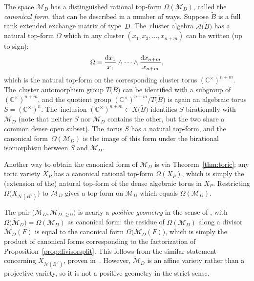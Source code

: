 \documentclass[10pt,a4paper]{amsart}
\def\C{{\mathbb C}}
\def\A{{\mathcal{A}}}
\def\tB{{\tilde B}}
\def\M{{\mathcal{M}}}
\def\tM{{\widetilde {\mathcal{M}}}}
\def\tB{{\tilde B}}
\def\N{{\mathcal{N}}}
\numberwithin{equation}{section}
\begin{document}
\bigskip{}
The space $\M_{D}$ has a distinguished rational top-form $\Omega(\M_D)$, called the \emph{canonical form}, that can be described in a number of ways. Suppose $\tB$ is a full rank extended exchange mat\-rix of type~$D$. The~cluster algebra $\A\big(\tB\big)$ has a natural top-form $\Omega$ which in any cluster $(x_1,x_2,\dots,x_{n+m})$ can be written (up to sign):
\begin{gather*}
\Omega = \frac{{\rm d}x_1}{x_1} \wedge \cdots \wedge \frac{{\rm d}x_{n+m}}{x_{n+m}},
\end{gather*}
which is the natural top-form on the corresponding cluster torus $(\C^\times)^{n+m}$. The~cluster automorphism group $T\big(\tB\big)$ can be identified with a subgroup of $(\C^\times)^{n+m}$, and the quotient group $(\C^\times)^{n+m}/T\big(\tB\big)$ is again an algebraic torus $S = (\C^\times)^n$. The~inclusion $(\C^\times)^{n+m} \subset X\big(\tB\big)$ identifies $S$ birationally with $\M_D$ (note that neither $S$ nor $\M_D$ contains the other, but the two share a common dense open subset). The~torus $S$ has a natural top-form, and the canonical form~$\Omega(\M_D)$ is the image of this form under the birational isomorphism between $S$ and $\M_D$.

Another way to obtain the canonical form of $\M_D$ is via Theorem~\ref{thm:toric}: any toric variety $X_P$ has a canonical rational top-form $\Omega(X_P)$, which is simply the (extension of the) natural top-form of the dense algebraic torus in $X_P$. Restricting $\Omega\big(X_{\N(B^\vee)}\big)$ to $\M_D$ gives a top-form on $\M_D$ which equals $\Omega(\M_D)$.

The pair $\big(\tM_D, \M_{D,\geq 0}\big)$ is nearly a \emph{positive geometry} in the sense of \cite{ABL}, with $\Omega\big(\tM_D\big) = \Omega(\M_D)$ as canonical form: the residue of $\Omega(\M_D)$ along a divisor $\tM_D(F)$ is equal to the canonical form $\Omega\big(\tM_D(F)\big)$, which is simply the product of canonical forms corresponding to the factorization of Proposition~\ref{prop:divisorsplit}. This follows from the similar statement concerning $X_{\N(B^\vee)}$, proven in~\cite[Appendix G]{ABL}. However, $\tM_D$ is an affine variety rather than a projective variety, so it is not a positive geometry in the strict sense.
\end{document}
